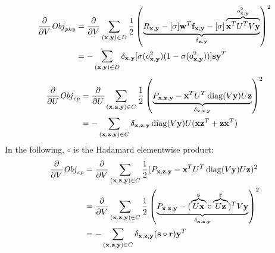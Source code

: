 \begin{align*}
\frac{\partial}{\partial V} \Obj_\phy & = \frac{\partial}{\partial V} \sum_{(\x,\y) \in D} \frac{1}{2} \left( \underbrace{R_{\x,\y} - [\sigma] \w^T \f_{\x,\y} - [\sigma] \overbrace{\x^T U^T V\y}^{o^2_{\x,\y}}}_{\delta_{\x,\y}}\right)^2 \\
& = - \sum_{(\x,\y) \in D}  \delta_{\x,\y} [\sigma(o^2_{\x,\y}) (1 - \sigma(o^2_{\x,\y}))] \s \y^T 
\end{align*}
\begin{align*}
\frac{\partial}{\partial U} \Obj_\rsc & = \frac{\partial}{\partial U} \sum_{(\x,\z,\y) \in C} \frac{1}{2} \left( \underbrace{P_{\x,\z,\y} - \x^T U^T \diag(V\y) U \z}_{\delta_{\x,\z,\y}} \right)^2\\
& = - \sum_{(\x,\z,\y) \in C} \delta_{\x,\z,\y} \diag(V\y) U (\x \z^T + \z \x^T)
\end{align*}
In the following, $\circ$ is the Hadamard elementwise product:
\begin{align*}
\frac{\partial}{\partial V} \Obj_\rsc & = \frac{\partial}{\partial V} \sum_{(\x,\z,\y) \in C} \frac{1}{2} (P_{\x,\z,\y} - \x^T U^T \diag(V\y) U \z)^2\\
 & = \frac{\partial}{\partial V} \sum_{(\x,\z,\y) \in C} \frac{1}{2} \left( \underbrace{P_{\x,\z,\y} -  (\overbrace{U\x}^\s \circ \overbrace{U\z}^\r)^T V\y}_{\delta_{\x,\z,\y}} \right)^2\\
 & = - \sum_{(\x,\z,\y) \in C} \delta_{\x,\z,\y} (\s \circ \r) \y^T
\end{align*}

